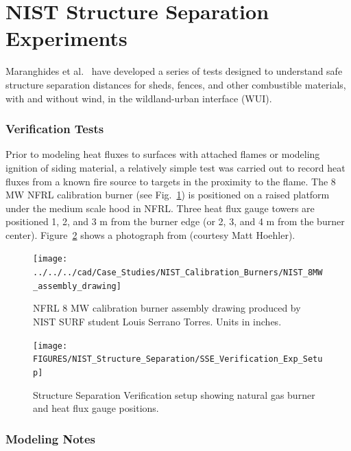 \section{NIST Structure Separation Experiments}
\label{NIST_Structure_Separation_Description}

Maranghides et al.~\cite{Maranghides:TN2161,Maranghides:TN2235} have developed a series of tests designed to understand safe structure separation distances for sheds, fences, and other combustible materials, with and without wind, in the wildland-urban interface (WUI).

\subsubsection{Verification Tests}

Prior to modeling heat fluxes to surfaces with attached flames or modeling ignition of siding material, a relatively simple test was carried out to record heat fluxes from a known fire source to targets in the proximity to the flame.  The 8 MW NFRL calibration burner \cite{Bryant:NISTSP1007} (see Fig.~\ref{NFRL_8MW_calibration_burner}) is positioned on a raised platform under the medium scale hood in NFRL.  Three heat flux gauge towers are positioned 1, 2, and 3 m from the burner edge (or 2, 3, and 4 m from the burner center).  Figure~\ref{NIST_SSE_Verification_Setup} shows a photograph from \cite{Maranghides:TN2235} (courtesy Matt Hoehler).

\begin{figure}[h]
\centering
\texttt{[image: ../../../cad/Case\_Studies/NIST\_Calibration\_Burners/NIST\_8MW\_assembly\_drawing]}
\caption[NFRL 8 MW calibration burner assembly drawing]{NFRL 8 MW calibration burner assembly drawing produced by NIST SURF student Louis Serrano Torres.  Units in inches.}
\label{NFRL_8MW_calibration_burner}
\end{figure}

\begin{figure}[h]
\centering
\texttt{[image: FIGURES/NIST\_Structure\_Separation/SSE\_Verification\_Exp\_Setup]}
\caption[Structure Separation Verification setup]{Structure Separation Verification setup showing natural gas burner and heat flux gauge positions.}
\label{NIST_SSE_Verification_Setup}
\end{figure}

\subsubsection{Modeling Notes}

